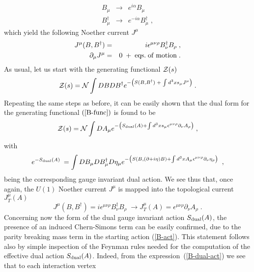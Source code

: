 \documentclass[a4paper,12pt]{article}
\begin{document}
\begin{eqnarray}
B_\mu &\to &e^{i\alpha }B_\mu  \label{B-u1} \\
B_\mu ^{\dagger } &\to &e^{-i\alpha }B_\mu ^{\dagger }\;,  \nonumber
\end{eqnarray}
which yield the following Noether current $J^\mu $
\begin{eqnarray}
J^\mu (B,B^{\dagger }) &=&i\epsilon ^{\mu \nu \rho }B_\nu^{\dagger }B_\rho \;,  \label{B-curr} \\
\partial _\mu J^\mu &=&0\;+\;{\rm eqs.\;of\;motion\;.}  \nonumber
\end{eqnarray}
As usual, let us start with the generating functional ${\cal Z}(s)$
\begin{equation}
{\cal Z}(s)={\cal N}\int DBDB^{\dagger }e^{-\left( S(B,B^{\dagger
})\;+\;\int d^3xs_\mu J^\mu \right) \;}.  \label{B-func}
\end{equation}
Repeating the same steps as before, it can be easily shown that the
dual form for the generating functional $\left( {\rm
    {\ref{B-func}}}\right) $ is found to be
\begin{equation}
{\cal Z}(s)={\cal N}\int DA_\mu e^{-\left( S_{{\rm dual}}(A)+\int d^3xs_\mu
\epsilon ^{\mu \nu \rho }\partial _\nu A_\rho \right) \;},  \label{B-dual}
\end{equation}
with
\begin{equation}
e^{-S_{{\rm dual}}(A)\;}=\int DB_\mu DB_\mu ^{\dagger }D\eta _\mu e^{-\left(
S(B,(\partial +i\eta )B)+\int d^3xA_\mu \epsilon ^{\mu \nu \rho }\partial_\nu \eta _\rho \right) \;}\;,  \label{B-dual-act}
\end{equation}
being the corresponding gauge invariant dual action. We see thus that,
once again, the $U(1)$ Noether current $J^\mu $ is mapped into
the topological current $J_T^\mu (A)$
\begin{equation}
J^\mu (B,B^{\dagger })=i\epsilon ^{\mu \nu \rho }B_\nu ^{\dagger}B_\rho \;\longrightarrow J_T^\mu (A)=\epsilon ^{\mu \nu \rho }\partial_\nu A_\rho \;.
\label{Bm-curr}
\end{equation}
Concerning now the form of the dual gauge invariant action $S_{\rm dual}(A)$,
  the presence of an induced Chern-Simons term can be easily
  confirmed, due to the parity breaking mass term in the starting
  action (\ref{B-act}). This statement follows also by simple
  inspection of the Feynman rules needed for the computation of the
  effective dual action $S_{\rm dual} (A)$. Indeed, from the
  expression~(\ref{B-dual-act}) we see that to each interaction vertex
\end{document}
